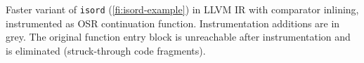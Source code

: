 \label{fig:isordascto} Faster variant of {\tt isord} (\myfigure\ref{fi:isord-example}) in LLVM IR with comparator inlining, instrumented as OSR continuation function. Instrumentation additions are in grey. The original function entry block is unreachable after instrumentation and is eliminated (struck-through code fragments).